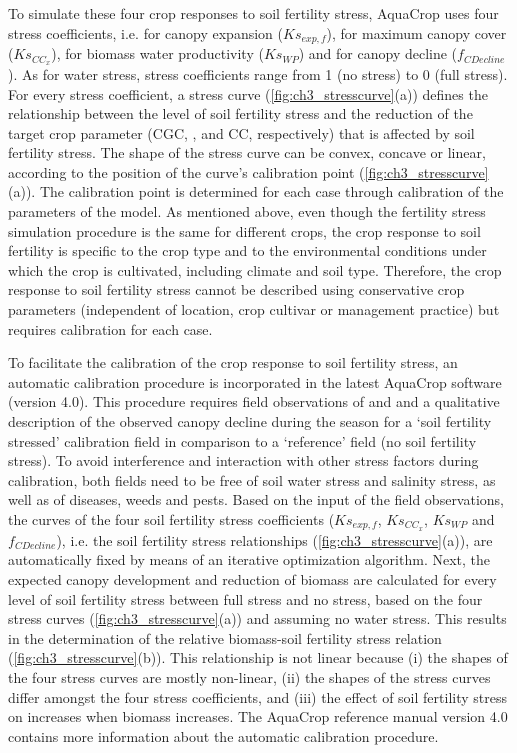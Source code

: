 To simulate these four crop responses to soil fertility stress, AquaCrop uses four stress coefficients, i.e. for canopy expansion ($Ks_{exp,f}$), for maximum canopy cover ($Ks_{CC_{x}}$), for biomass water productivity ($Ks_{WP}$) and for canopy decline ($f_{CDecline}$). As for water stress, stress coefficients range from 1 (no stress) to 0 (full stress). For every stress coefficient, a stress curve (\autoref{fig:ch3_stresscurve}(a)) defines the relationship between the level of soil fertility stress and the reduction of the target crop parameter (CGC, \CCx, \WPster and CC, respectively) that is affected by soil fertility stress. The shape of the stress curve can be convex, concave or linear, according to the position of the curve's calibration point (\autoref{fig:ch3_stresscurve}(a)). The calibration point is determined for each case through calibration of the parameters of the model. As mentioned above, even though the fertility stress simulation procedure is the same for different crops, the crop response to soil fertility is specific to the crop type and to the environmental conditions under which the crop is cultivated, including climate and soil type. Therefore, the crop response to soil fertility stress cannot be described using conservative crop parameters (independent of location, crop cultivar or management practice) but requires calibration for each case. 

To facilitate the calibration of the crop response to soil fertility stress, an automatic calibration procedure is incorporated in the latest AquaCrop software (version 4.0). This procedure requires field observations of \CCx and \Brel and a qualitative description of the observed canopy decline during the season for a `soil fertility stressed' calibration field in comparison to a `reference' field (no soil fertility stress). To avoid interference and interaction with other stress factors during calibration, both fields need to be free of soil water stress and salinity stress, as well as of diseases, weeds and pests. Based on the input of the field observations, the curves of the four soil fertility stress coefficients ($Ks_{exp,f}$, $Ks_{CC_{x}}$, $Ks_{WP}$ and $f_{CDecline}$), i.e. the soil fertility stress relationships (\autoref{fig:ch3_stresscurve}(a)), are automatically fixed by means of an iterative optimization algorithm. Next, the expected canopy development and reduction of biomass are calculated for every level of soil fertility stress between full stress and no stress, based on the four stress curves (\autoref{fig:ch3_stresscurve}(a)) and assuming no water stress. This results in the determination of the relative biomass-soil fertility stress relation (\autoref{fig:ch3_stresscurve}(b)). This relationship is not linear because (i) the shapes of the four stress curves are mostly non-linear, (ii) the shapes of the stress curves differ amongst the four stress coefficients, and (iii) the effect of soil fertility stress on \WPster increases when biomass increases. The AquaCrop reference manual version 4.0 \parencite{raes2012} contains more information about the automatic calibration procedure.

